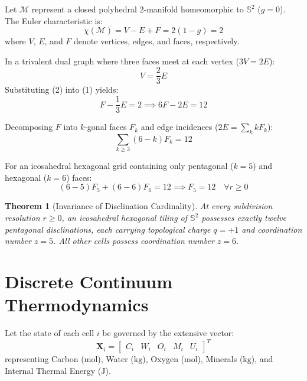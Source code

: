 \documentclass[10pt,twocolumn,a4paper]{article}
\newtheorem{theorem}{Theorem}
\begin{document}
Let $\mathcal{M}$ represent a closed polyhedral 2-manifold homeomorphic to $\mathbb{S}^2$ ($g=0$). The Euler characteristic is:
\begin{equation}
\chi(\mathcal{M}) = V - E + F = 2(1 - g) = 2
\end{equation}
where $V$, $E$, and $F$ denote vertices, edges, and faces, respectively.

In a trivalent dual graph where three faces meet at each vertex ($3V = 2E$):
\begin{equation}
V = \frac{2}{3}E
\end{equation}
Substituting (2) into (1) yields:
\begin{equation}
F - \frac{1}{3}E = 2 \implies 6F - 2E = 12
\end{equation}

Decomposing $F$ into $k$-gonal faces $F_k$ and edge incidences ($2E = \sum_k k F_k$):
\begin{equation}
\sum_{k \ge 3} (6 - k) F_k = 12
\end{equation}

For an icosahedral hexagonal grid containing only pentagonal ($k=5$) and hexagonal ($k=6$) faces:
\begin{equation}
(6 - 5) F_5 + (6 - 6) F_6 = 12 \implies F_5 = 12 \quad \forall r \ge 0
\end{equation}

\begin{theorem}[Invariance of Disclination Cardinality]
At every subdivision resolution $r \ge 0$, an icosahedral hexagonal tiling of $\mathbb{S}^2$ possesses exactly twelve pentagonal disclinations, each carrying topological charge $q = +1$ and coordination number $z = 5$. All other cells possess coordination number $z = 6$.
\end{theorem}

\section{Discrete Continuum Thermodynamics}

Let the state of each cell $i$ be governed by the extensive vector:
\begin{equation}
\mathbf{X}_i = \begin{bmatrix} C_i & W_i & O_i & M_i & U_i \end{bmatrix}^T
\end{equation}
representing Carbon ($\text{mol}$), Water ($\text{kg}$), Oxygen ($\text{mol}$), Minerals ($\text{kg}$), and Internal Thermal Energy ($\text{J}$).
\end{document}
